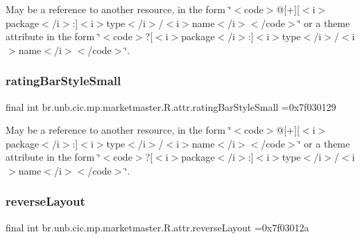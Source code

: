 May be a reference to another resource, in the form \char`\"{}$<$code$>$@\mbox{[}+\mbox{]}\mbox{[}$<$i$>$package$<$/i$>$\+:\mbox{]}$<$i$>$type$<$/i$>$/$<$i$>$name$<$/i$>$$<$/code$>$\char`\"{} or a theme attribute in the form \char`\"{}$<$code$>$?\mbox{[}$<$i$>$package$<$/i$>$\+:\mbox{]}$<$i$>$type$<$/i$>$/$<$i$>$name$<$/i$>$$<$/code$>$\char`\"{}. \mbox{\label{classbr_1_1unb_1_1cic_1_1mp_1_1marketmaster_1_1R_1_1attr_aa25cd2149048680a00d82e35044a3b25}} 
\subsubsection{\texorpdfstring{rating\+Bar\+Style\+Small}{ratingBarStyleSmall}}
{\footnotesize\ttfamily final int br.\+unb.\+cic.\+mp.\+marketmaster.\+R.\+attr.\+rating\+Bar\+Style\+Small =0x7f030129\hspace{0.3cm}{\ttfamily [static]}}

May be a reference to another resource, in the form \char`\"{}$<$code$>$@\mbox{[}+\mbox{]}\mbox{[}$<$i$>$package$<$/i$>$\+:\mbox{]}$<$i$>$type$<$/i$>$/$<$i$>$name$<$/i$>$$<$/code$>$\char`\"{} or a theme attribute in the form \char`\"{}$<$code$>$?\mbox{[}$<$i$>$package$<$/i$>$\+:\mbox{]}$<$i$>$type$<$/i$>$/$<$i$>$name$<$/i$>$$<$/code$>$\char`\"{}. \mbox{\label{classbr_1_1unb_1_1cic_1_1mp_1_1marketmaster_1_1R_1_1attr_a6409a444b0f9b172a414ea7f779f77a6}} 
\subsubsection{\texorpdfstring{reverse\+Layout}{reverseLayout}}
{\footnotesize\ttfamily final int br.\+unb.\+cic.\+mp.\+marketmaster.\+R.\+attr.\+reverse\+Layout =0x7f03012a\hspace{0.3cm}{\ttfamily [static]}}

